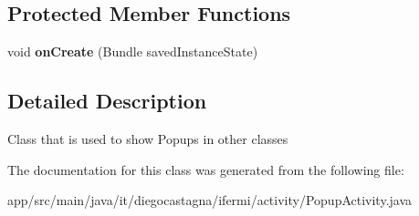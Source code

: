 \subsection*{Protected Member Functions}
\begin{DoxyCompactItemize}
\item 
\mbox{\label{classit_1_1diegocastagna_1_1ifermi_1_1activity_1_1_popup_activity_a78db3a8b58be25e9785cee14bc7acdce}} 
void {\bfseries on\+Create} (Bundle saved\+Instance\+State)
\end{DoxyCompactItemize}


\subsection{Detailed Description}
Class that is used to show Popups in other classes 

The documentation for this class was generated from the following file\+:\begin{DoxyCompactItemize}
\item 
app/src/main/java/it/diegocastagna/ifermi/activity/Popup\+Activity.\+java\end{DoxyCompactItemize}
